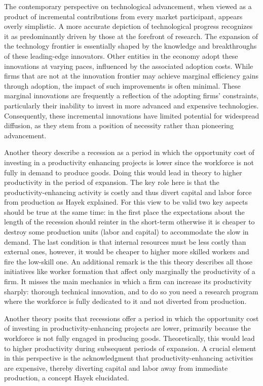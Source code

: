 \documentclass[12pt]{report}
\begin{document}
The contemporary perspective on technological advancement, when viewed as a product of incremental contributions from
every market participant, appears overly simplistic. A more accurate depiction of technological progress recognizes it
as predominantly driven by those at the forefront of research. The expansion of the technology frontier is essentially
shaped by the knowledge and breakthroughs of these leading-edge innovators. Other entities in the economy adopt these
innovations at varying paces, influenced by the associated adoption costs. While firms that are not at the innovation
frontier may achieve marginal efficiency gains through adoption, the impact of such improvements is often minimal. These
marginal innovations are frequently a reflection of the adopting firms' constraints, particularly their inability to
invest in more advanced and expensive technologies. Consequently, these incremental innovations have limited potential
for widespread diffusion, as they stem from a position of necessity rather than pioneering advancement. 

Another theory describe a recession as a period in which the opportunity cost of investing in a productivity enhancing
projects is lower since the workforce is not fully in demand to produce goods. Doing this would lead in theory to higher
productivity in the period of expansion. The key role here is that the productivity-enhancing activity is costly and thus
divert capital and labor force from production as Hayek \cite{Hay33} explained. 
For this view to be valid two key aspects should be true at the same time: in the first place the
expectations about the length of the recession should reinter in the short-term otherwise it is cheaper to destroy some
production units (labor and capital) to accommodate the slow in demand. The last condition is that internal resources
must be less costly than external ones, however, it would be cheaper to higher more skilled workers and fire the low-skill
one. An additional remark is the this theory describes all those initiatives like worker formation that affect only
marginally the productivity of a firm. It misses the main mechanics in which a firm can increase its productivity sharply: thorough technical
innovation, and to do so you need a research program where the workforce is fully dedicated to it and not
diverted from production.

Another theory posits that recessions offer a period in which the opportunity cost of investing in
productivity-enhancing projects are lower, primarily because the workforce is not fully engaged in producing goods.
Theoretically, this would lead to higher productivity during subsequent periods of expansion. A crucial element in this
perspective is the acknowledgment that productivity-enhancing activities are expensive, thereby diverting capital and
labor away from immediate production, a concept Hayek \cite{Hay33} elucidated. 
\end{document}
